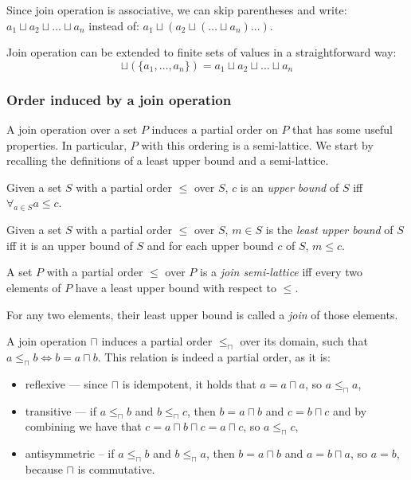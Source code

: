 Since join operation is associative, we can skip parentheses and write: $ a_1 \sqcup a_2 \sqcup \dots \sqcup a_n$ instead of: $ a_1 \sqcup (a_2 \sqcup ( \dots \sqcup a_n) \dots )$.

Join operation can be extended to finite sets of values in a straightforward way:
$$\sqcup(\{a_1, \dots, a_n \}) = a_1 \sqcup a_2 \sqcup \dots \sqcup a_n$$

\subsubsection{Order induced by a join operation}

A join operation over a set $P$ induces a partial order on $P$ that has some useful properties. In particular, $P$ with this ordering is a semi-lattice. We start by recalling the definitions of a least upper bound and a semi-lattice.

\begin{defn}
Given a set $S$ with a partial order $\le$ over $S$, $c$ is an \emph{upper bound} of $S$ iff $\forall_{a \in S} a \le c$.
\end{defn}

\begin{defn}
Given a set $S$ with a partial order $\le$ over $S$, $m \in S$ is the \emph{least upper bound} of $S$ iff it is an upper bound of $S$ and for each upper bound $c$ of $S$, $m \le c$.
\end{defn}

\begin{defn}
A set $P$ with a partial order $\le$ over $P$ is a \emph{join semi-lattice} iff every two elements of $P$ have a least upper bound with respect to $\le$.
\end{defn}

For any two elements, their least upper bound is called a \emph{join} of those elements.

A join operation $\sqcap$ induces a partial order $\le_\sqcap$ over its domain, such that $a \le_\sqcap b \iff b = a \sqcap b$. This relation is indeed a partial order, as it is:
\begin{itemize}
\item reflexive --- since $\sqcap$ is idempotent, it holds that $a = a \sqcap a$, so  $a \le_\sqcap a$,
\item transitive --- if $a \le_\sqcap b$ and $b \le_\sqcap c$, then $b = a \sqcap b$ and $c = b \sqcap c$ and by combining we have that $c = a \sqcap b \sqcap c = a \sqcap c$, so $a \le_\sqcap c$,
\item antisymmetric -- if $a \le_\sqcap b$ and $b \le_\sqcap a$, then $b = a \sqcap b$ and $a = b \sqcap a$, so $a = b$, because $\sqcap$ is commutative.
\end{itemize}

